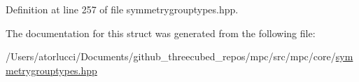 Definition at line 257 of file symmetrygrouptypes.\+hpp.



The documentation for this struct was generated from the following file\+:\begin{DoxyCompactItemize}
\item 
/\+Users/atorlucci/\+Documents/github\+\_\+threecubed\+\_\+repos/mpc/src/mpc/core/\mbox{\hyperlink{symmetrygrouptypes_8hpp}{symmetrygrouptypes.\+hpp}}\end{DoxyCompactItemize}
